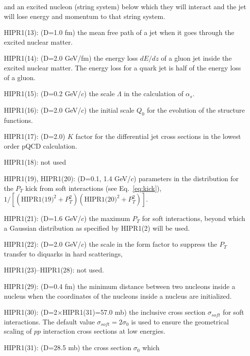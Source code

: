 \begin{description}
                and an excited nucleon (string system) below which they 
                will interact and the jet will lose energy and momentum 
                to that string system.
\item{}HIPR1(13): (D=1.0 fm) the mean free path of a jet when it goes 
                through the excited nuclear matter.
\item{}HIPR1(14): (D=2.0 GeV/fm) the energy loss $dE/dz$ of a gluon 
                jet inside the excited nuclear matter. The energy loss
                for a quark jet is half of the energy loss of a gluon.
\item{}HIPR1(15): (D=0.2 GeV/$c$) the scale $\Lambda$ in the 
                calculation of $\alpha_s$.
\item{}HIPR1(16): (D=2.0 GeV/$c$) the initial scale $Q_0$ for the 
                evolution of the structure functions.
\item{}HIPR1(17): (D=2.0) $K$ factor for the differential jet cross 
                sections in the lowest order pQCD calculation.
\item{}HIPR1(18): not used
\item{}HIPR1(19), HIPR1(20): (D=0.1, 1.4 GeV/$c$) parameters in the 
                distribution for the $P_T$ kick from soft interactions 
                (see Eq.~\ref{eq:kick}),
                $1/[(\mbox{HIPR1(19)}^2+P_T^2)(\mbox{HIPR1(20)}^2+P_T^2)]$.
\item{}HIPR1(21): (D=1.6 GeV/$c$) the maximum $P_T$ for soft interactions,
                beyond which a Gaussian distribution as specified by 
                HIPR1(2) will be used.
\item{}HIPR1(22): (D=2.0 GeV/$c$) the scale in the form factor to suppress 
                the $P_T$ transfer to diquarks in hard scatterings,
\item{}HIPR1(23)--HIPR1(28): not used.
\item{}HIPR1(29): (D=0.4 fm) the minimum distance between two nucleons
                inside a nucleus when the coordinates of the nucleons 
                inside a nucleus are initialized.
\item{}HIPR1(30): (D=2$\times$HIPR1(31)=57.0 mb) the inclusive cross 
                section $\sigma_{soft}$ for soft interactions. The default
                value $\sigma_{soft}=2\sigma_0$ is used to ensure the 
                geometrical scaling of $pp$ interaction cross sections 
                at low energies.
\item{}HIPR1(31): (D=28.5 mb) the cross section $\sigma_0$ which 

\end{description}
